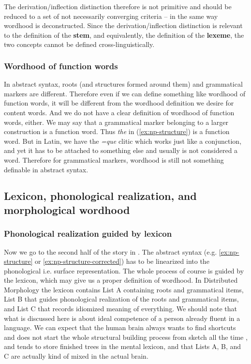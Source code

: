 \documentclass[a4paper, oneside, scheme=plain, 12pt]{article}
\newcommand*{\concept}[1]{\textbf{#1}}
\newcommand{\form}[1]{\emph{#1}}
\begin{document}
The derivation/inflection distinction therefore is not primitive 
and should be reduced to a set of not necessarily converging criteria
-- in the same way wordhood is deconstructed.
Since the derivation/inflection distinction is relevant to the definition of the \concept{stem},
and equivalently, the definition of the \concept{lexeme},
the two concepts cannot be defined cross-linguistically.

\subsubsection{Wordhood of function words}\label{sec:no-function-word-in-syntax}

In abstract syntax, roots (and structures formed around them) and grammatical markers are different.
Therefore even if we can define something like wordhood of function words,
it will be different from the wordhood definition we desire for content words.
And we do not have a clear definition of wordhood of function words, either.
We may say that a grammatical marker belonging to a larger construction is a function word.
Thus \form{the} in (\ref{ex:np-structure}) is a function word.
But in Latin, we have the \form{=que} clitic which works just like a conjunction,
and yet it has to be attached to something else and usually is not considered a word.
Therefore for grammatical markers, wordhood is still not something definable in abstract syntax.

\subsection{Lexicon, phonological realization, and morphological wordhood}\label{sec:vocabulary-inesrtion}

\subsubsection{Phonological realization guided by lexicon}\label{sec:realization}

Now we go to the second half of the story in .
The abstract syntax (e.g. \ref{ex:np-structure} or \ref{ex:np-structure-corrected})
has to be linearized into the phonological i.e. surface representation.
The whole process of course is guided by the lexicon,
which may give us a proper definition of wordhood.
In Distributed Morphology the lexicon contains List A containing roots and grammatical items,
List B that guides phonological realization of the roots and grammatical items,
and List C that records idiomized meaning of everything.
We should note that what is discussed here is about ideal competence of a person already fluent in a language.
We can expect that the human brain always wants to find shortcuts
and does not start the whole structural building process from sketch all the time \citep{matchin2020cortical},
and tends to store finished trees in the mental lexicon,
and that Lists A, B, and C are actually kind of mixed in the actual brain. 
\end{document}
